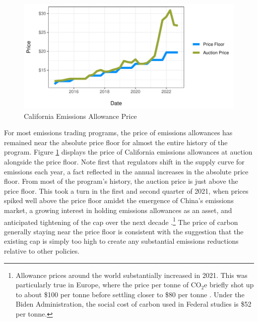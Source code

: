 \begin{figure}
    \centering
    \caption{California Emissions Allowance Price \label{allowance_pr}}
    \includegraphics[width=\textwidth]{figures/chapter3_figures/allowance_prices.pdf}
\end{figure}

For most emissions trading programs, the price of emissions allowances has remained near the absolute price floor for almost the entire history of the program. Figure \ref{allowance_pr} displays the price of California emissions allowances at auction alongside the price floor. Note first that regulators shift in the supply curve for emissions each year, a fact reflected in the annual increases in the absolute price floor. From most of the program's history, the auction price is just above the price floor. This took a turn in the first and second quarter of 2021, when prices spiked well above the price floor amidst the emergence of China's emissions market, a growing interest in holding emissions allowances as an asset, and anticipated tightening of the cap over the next decade \citep{storrow2022price}.\footnote{Allowance prices around the world substantially increased in 2021. This was particularly true in Europe, where the price per tonne of CO$_2$e briefly shot up to about \$100 per tonne before settling closer to \$80 per tonne \citep{manzagol2022global}. Under the Biden Administration, the social cost of carbon used in Federal studies is \$52 per tonne.} The price of carbon generally staying near the price floor is consistent with the suggestion that the existing cap is simply too high to create any substantial emissions reductions relative to other policies. 

